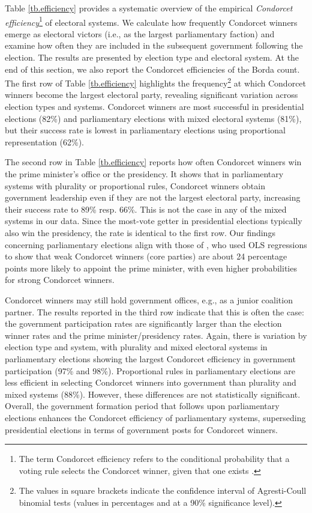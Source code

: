 \documentclass[12pt]{scrartcl}
\begin{document}
Table \ref{tb.efficiency} provides a systematic overview of the empirical \textit{Condorcet efficiency}\footnote{
    The term Condorcet efficiency refers to the conditional probability that a voting rule selects the Condorcet winner, given that one exists \citep{Gehrlein1998}.
} of electoral systems. We calculate how frequently Condorcet winners emerge as electoral victors (i.e., as the largest parliamentary faction) and examine how often they are included in the subsequent government following the election. The results are presented by election type and electoral system. At the end of this section, we also report the Condorcet efficiencies of the Borda count. The first row of Table \ref{tb.efficiency} highlights the frequency\footnote{
    The values in square brackets indicate the confidence interval of Agresti-Coull binomial tests \citep{Agresti1998} (values in percentages and at a 90\% significance level).
} at which Condorcet winners become the largest electoral party, revealing significant variation across election types and systems. Condorcet winners are most successful in presidential elections (82\%) and parliamentary elections with mixed electoral systems (81\%), but their success rate is lowest in parliamentary elections using proportional representation (62\%). 


 
The second row in Table \ref{tb.efficiency} reports how often Condorcet winners win the prime minister's office or the presidency. It shows that in parliamentary systems with plurality or proportional rules, Condorcet winners obtain government leadership even if they are not the largest electoral party, increasing their success rate to 89\% resp. 66\%. This is not the case in any of the mixed systems in our data.  Since the most-vote getter in presidential elections typically also win the presidency, the rate is identical to the first row. Our findings concerning parliamentary elections align with those of \cite{Desai2025}, who used OLS regressions to show that weak Condorcet winners (core parties) are about 24 percentage points more likely to appoint the prime minister, with even higher probabilities for strong Condorcet winners.

Condorcet winners may still hold government offices, e.g., as a junior coalition partner. The results reported in the third row indicate that this is often the case: the government participation rates are significantly larger than the election winner rates and the prime minister/presidency rates. Again, there is variation by election type and system, with plurality and mixed electoral systems in parliamentary elections showing the largest Condorcet efficiency in government participation (97\% and 98\%). Proportional rules in parliamentary elections are less efficient in selecting Condorcet winners into government than plurality and mixed systems (88\%). However, these differences are not statistically significant.  Overall, the government formation period that follows upon parliamentary elections enhances the Condorcet efficiency of parliamentary systems, superseding presidential elections in terms of government posts for Condorcet winners.
\end{document}
